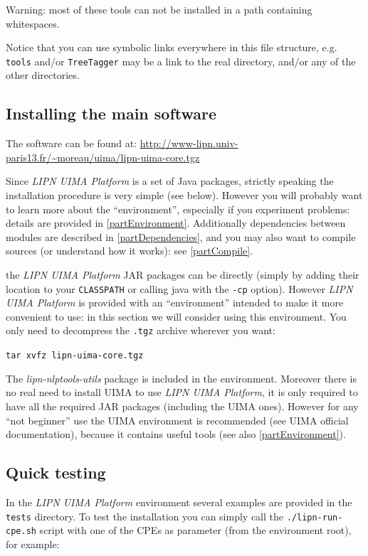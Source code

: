 \documentclass{article}
\newcommand{\softName}{{\em LIPN UIMA Platform}\xspace}
\newcommand{\archiveName}{lipn-uima-core.tgz}
\newcommand{\urlVersionStable}{http://www-lipn.univ-paris13.fr/~moreau/uima/\archiveName}
\newcommand{\utilsModule}{{\em lipn-nlptools-utils}\xspace}
\begin{document}
Warning: most of these tools can not be installed in a path containing whitespaces. 

Notice that you can use symbolic links everywhere in this file structure, e.g. {\tt tools} and/or {\tt TreeTagger} may be a link to the real directory, and/or any of the other directories.




\subsection{Installing the main software}

The software can be found at:
\url{\urlVersionStable}

Since \softName is a set of Java packages, strictly speaking the installation procedure is very simple (see below). However you will probably want to learn more about the ``environment'', especially if you experiment problems: details are provided in \ref{partEnvironment}. Additionally dependencies between modules are described in \ref{partDependencies}, and you may also want to compile sources (or understand how it works): see \ref{partCompile}.

the \softName JAR packages can be directly (simply by adding their location to your {\tt CLASSPATH} or calling java with the {\tt -cp} option). However \softName is provided with an ``environment'' intended to make it more convenient to use: in this section we will consider using this environment. You only need to decompress the {\tt .tgz} archive wherever you want:

{\tt tar xvfz \archiveName}

The \utilsModule package is included in the environment. Moreover there is no real need to install UIMA to use \softName, it is only required to have all the required JAR packages (including the UIMA ones). However for any ``not beginner'' use the UIMA environment is recommended (see UIMA official documentation), because it contains useful tools (see also \ref{partEnvironment}). 


\subsection{Quick testing}

\label{partTests}

In the \softName environment several examples are provided in the {\tt tests} directory. To test the installation you can simply call the {\tt ./lipn-run-cpe.sh} script with one of the CPEs as parameter (from the environment root), for example:
\end{document}
